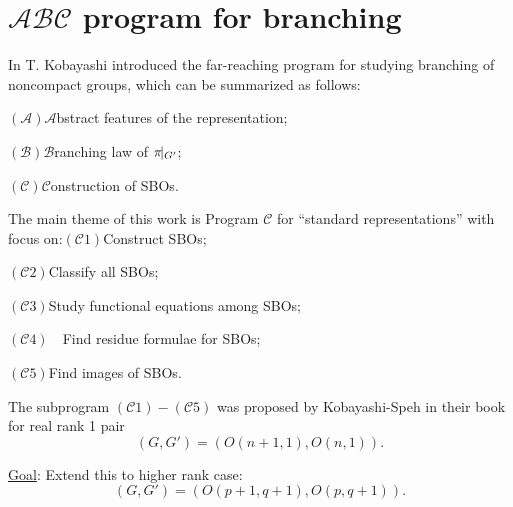 \documentclass[notes,notheorems]{beamer}
\theoremstyle{definition}
\theoremstyle{example}
\theoremstyle{plain}
\theoremstyle{mystyle}
\begin{document}
\section{$\mathcal{A}\mathcal{B}\mathcal{C}$ program for branching}

\begin{frame}{}
\quad In \cite{kobayashi2015program} T. Kobayashi introduced the
far-reaching program for studying branching of noncompact groups, which can be
summarized as follows:{

}\qquad$(\mathcal{A})$\quad$\mathcal{A}$bstract features of the
representation;{

}\qquad$(\mathcal{B})$\quad$\mathcal{B}$ranching law of $\pi\kern-0.15cm\mid_{G'}$; {

}\qquad$(\mathcal{C})$\quad$\mathcal{C}${onstruction} {of}
{SBOs}.
\end{frame}
\begin{frame}{}
	
The main theme of this work is Program $\mathcal{C}$ for ``standard
representations'' with focus on:\vspace{-1em}{

}\qquad$(\mathcal{C}1)$\quad Construct SBOs;{

}\qquad$(\mathcal{C}2)$\quad Classify all SBOs;{

}\qquad$(\mathcal{C}3)$\quad Study functional equations among SBOs;{

}\qquad$(\mathcal{C}4) \quad$Find residue formulae for SBOs;{

}\qquad$(\mathcal{C}5)$\quad Find images of SBOs.{

}\vspace{-1em}\quad The subprogram $(\mathcal{C}1) - (\mathcal{C}5)$ was proposed by
Kobayashi-Speh in their book \cite{kobayashi2015symmetry} for real rank 1
pair
\begin{equation*}
(G, G') = (O (n + 1, 1), O (n, 1)).
\end{equation*}
\vspace{-1.5em}
\begin{block}{\underline{Goal}:}
	Extend this to higher rank case:
\vspace{-1em}
	\begin{equation*}
		(G, G') = (O (p + 1, q + 1), O (p, q + 1)).
	\end{equation*}
\vspace{-2em}
\end{block}
\end{frame}
\end{document}
